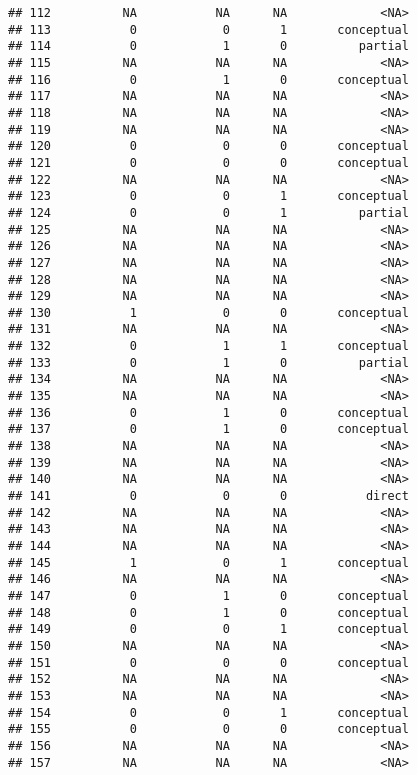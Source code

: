 \documentclass[
  english,
  man]{apa6}
\begin{document}
\begin{verbatim}
## 112          NA           NA      NA             <NA>
## 113           0            0       1       conceptual
## 114           0            1       0          partial
## 115          NA           NA      NA             <NA>
## 116           0            1       0       conceptual
## 117          NA           NA      NA             <NA>
## 118          NA           NA      NA             <NA>
## 119          NA           NA      NA             <NA>
## 120           0            0       0       conceptual
## 121           0            0       0       conceptual
## 122          NA           NA      NA             <NA>
## 123           0            0       1       conceptual
## 124           0            0       1          partial
## 125          NA           NA      NA             <NA>
## 126          NA           NA      NA             <NA>
## 127          NA           NA      NA             <NA>
## 128          NA           NA      NA             <NA>
## 129          NA           NA      NA             <NA>
## 130           1            0       0       conceptual
## 131          NA           NA      NA             <NA>
## 132           0            1       1       conceptual
## 133           0            1       0          partial
## 134          NA           NA      NA             <NA>
## 135          NA           NA      NA             <NA>
## 136           0            1       0       conceptual
## 137           0            1       0       conceptual
## 138          NA           NA      NA             <NA>
## 139          NA           NA      NA             <NA>
## 140          NA           NA      NA             <NA>
## 141           0            0       0           direct
## 142          NA           NA      NA             <NA>
## 143          NA           NA      NA             <NA>
## 144          NA           NA      NA             <NA>
## 145           1            0       1       conceptual
## 146          NA           NA      NA             <NA>
## 147           0            1       0       conceptual
## 148           0            1       0       conceptual
## 149           0            0       1       conceptual
## 150          NA           NA      NA             <NA>
## 151           0            0       0       conceptual
## 152          NA           NA      NA             <NA>
## 153          NA           NA      NA             <NA>
## 154           0            0       1       conceptual
## 155           0            0       0       conceptual
## 156          NA           NA      NA             <NA>
## 157          NA           NA      NA             <NA>

\end{verbatim}
\end{document}
